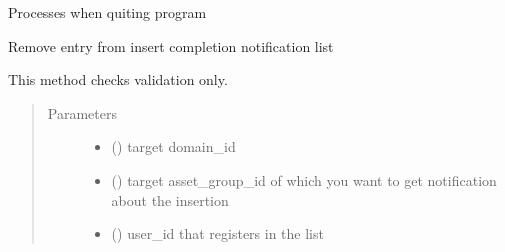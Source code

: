 \documentclass[letterpaper,10pt,english]{sphinxmanual}
\begin{document}
\begin{fulllineitems}
\begin{fulllineitems}
\end{fulllineitems}


\begin{fulllineitems}
\label{\detokenize{bbc1.core.bbc_core:bbc1.core.bbc_core.BBcCoreService.quit_program}}
Processes when quiting program

\end{fulllineitems}


\begin{fulllineitems}
\label{\detokenize{bbc1.core.bbc_core:bbc1.core.bbc_core.BBcCoreService.remove_from_notification_list}}
Remove entry from insert completion notification list

This method checks validation only.
\begin{quote}\begin{description}
\item[{Parameters}] \leavevmode\begin{itemize}
\item {} 
 () \textendash{} target domain\_id

\item {} 
 () \textendash{} target asset\_group\_id of which you want to get notification about the insertion

\item {} 
 () \textendash{} user\_id that registers in the list

\end{itemize}

\end{description}\end{quote}

\end{fulllineitems}



\end{fulllineitems}
\end{document}
